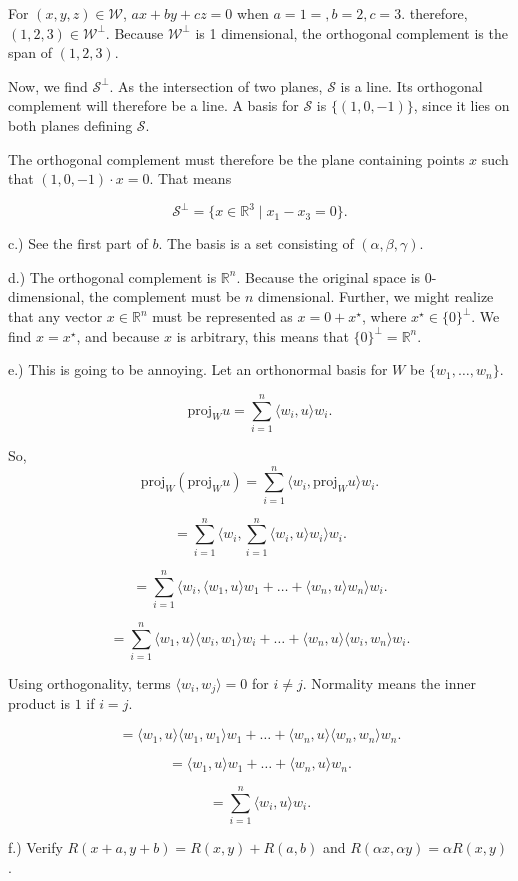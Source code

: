\documentclass{article}
\begin{document}
For $(x,y,z)\in\mathcal{W}$, $ax+by+cz=0$ when $a=1=,b=2,c=3$. therefore, $(1,2,3)\in\mathcal{W}^\perp$. Because $\mathcal{W}^\perp$ is 1 dimensional, the orthogonal complement is the span of $(1,2,3)$. 

Now, we find $\mathcal{S}^\perp$. As the intersection of two planes, $\mathcal{S}$ is a line. Its orthogonal complement will therefore be a line. A basis for $\mathcal{S}$ is $\{ (1,0,-1) \}$, since it lies on both planes defining $\mathcal{S}$. 

The orthogonal complement must therefore be the plane containing points $x$ such that $(1,0,-1)\cdot x = 0$. That means 

$$\mathcal{S}^\perp  = \{x\in \mathbb{R}^3 \mid x_1-x_3=0\}.$$

c.) See the first part of $b$. The basis is a set consisting of $(\alpha, \beta, \gamma)$. 

d.) The orthogonal complement is $\mathbb{R}^n$. Because the original space is 0-dimensional, the complement must be $n$ dimensional. Further, we might realize that any vector $x\in\mathbb{R}^n$ must be represented as $x= 0+x^\star$, where $x^\star\in\{0\}^\perp$. We find $x = x^\star$, and because $x$ is arbitrary, this means that $\{0\}^\perp = \mathbb{R}^n$. 

e.) This is going to be annoying. Let an orthonormal basis for $W$ be $\{w_1, \dots, w_n\}$. 


$$\text{proj}_W u = \sum_{i=1}^n \langle w_i, u\rangle w_i.$$

So, $$\text{proj}_W (\text{proj}_W u) = \sum_{i=1}^n \langle w_i, \text{proj}_W u\rangle w_i.$$

$$ = \sum_{i=1}^n \langle w_i, \sum_{i=1}^n \langle w_i, u\rangle w_i\rangle w_i.$$

$$ = \sum_{i=1}^n \langle w_i, \langle w_1, u\rangle w_1 +\dots + \langle w_n, u \rangle w_n \rangle w_i.$$


$$ = \sum_{i=1}^n\langle w_1, u\rangle \langle w_i,  w_1\rangle w_i  + \dots + \langle w_n, u \rangle \langle w_i,  w_n \rangle w_i.$$


Using orthogonality, terms $\langle w_i, w_j\rangle =0$ for $i\neq j$. Normality means the inner product is $1$ if $i=j$.

$$ = \langle w_1, u\rangle \langle w_1,  w_1\rangle w_1 + \dots + \langle w_n, u \rangle \langle w_n,  w_n \rangle w_n.$$

$$ = \langle w_1, u\rangle w_1 + \dots + \langle w_n, u \rangle w_n.$$

$$ = \sum_{i=1}^n \langle w_i, u\rangle w_i.$$

f.) Verify $R(x+a,y+b)= R(x,y)+R(a,b)$ and $R(\alpha x, \alpha y) = \alpha R(x,y)$. 
\end{document}
